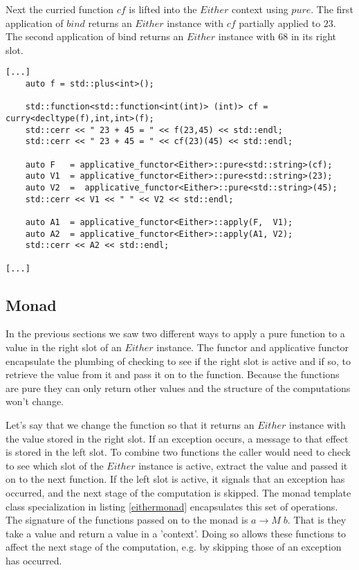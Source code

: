 \documentclass[12pt,fleqn]{article}
\begin{document}
Next the curried function $cf$ is lifted into the $Either$ context using $pure$.
The first application of $bind$ returns an $Either$ instance with $cf$ partially applied to $23$.
The second application of bind returns an $Either$ instance with $68$ in its right slot.


%
%
\begin{minipage}{\linewidth}
\begin{lstlisting}[caption=Either applicative, label=eitherappexamp]
[...]
    auto f = std::plus<int>();

	std::function<std::function<int(int)> (int)> cf = 	curry<decltype(f),int,int>(f);
	std::cerr << " 23 + 45 = " << f(23,45) << std::endl;
	std::cerr << " 23 + 45 = " << cf(23)(45) << std::endl;

	auto F   = applicative_functor<Either>::pure<std::string>(cf);
	auto V1  = applicative_functor<Either>::pure<std::string>(23);
	auto V2  =  applicative_functor<Either>::pure<std::string>(45);
	std::cerr << V1 << " " << V2 << std::endl;  
	
	auto A1  = applicative_functor<Either>::apply(F,  V1);
	auto A2  = applicative_functor<Either>::apply(A1, V2);
	std::cerr << A2 << std::endl;  

[...]
\end{lstlisting}
\end{minipage}
%
%
%

\subsection{Monad}
%

In the previous sections we saw two different ways to apply a pure function to a value in the right slot of an $Either$ instance.
The functor and applicative functor encapsulate the plumbing of checking to see if the right slot is active and if so, to retrieve
the value from it and pass it on to the function.
Because the functions are pure they can only return other values and the structure of the computations won't change.

Let's say that we change the function so that it returns an $Either$ instance with the value stored in the right slot.
If an exception occurs, a message to that effect is stored in the left slot.
To combine two functions the caller would need to check to see which slot of the $Either$ instance is active, extract the value and passed it on to the next function.
If the left slot is active, it signals that an exception has occurred, and the next stage of the computation is skipped.
The monad template class specialization in listing \ref{eithermonad} encapsulates this set of operations.
The signature of the functions passed on to the monad is $ a \rightarrow M \; b$. That is they take a value and return a value in a 'context'.
Doing so allows these functions to affect the next stage of the computation, e.g. by skipping those of an exception has occurred.
\end{document}
